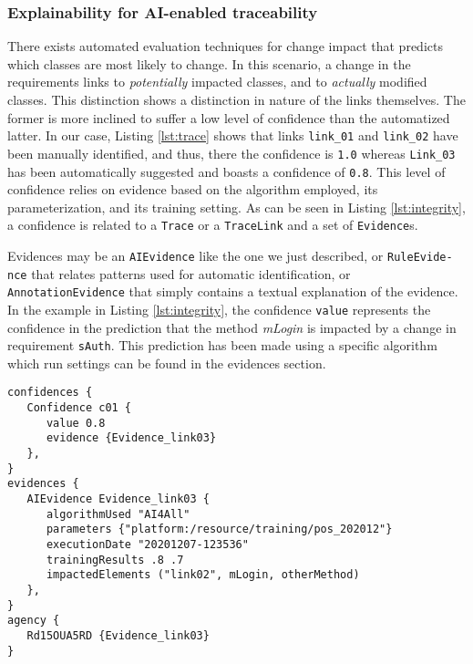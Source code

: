 \subsubsection{Explainability for AI-enabled traceability}
There exists automated evaluation techniques for change impact that predicts which classes are most likely to change. In this scenario, a change in the requirements links to \textit{potentially} impacted classes, and to \textit{actually} modified classes. This distinction shows a distinction in nature of the links themselves. The former is more inclined to suffer a low level of confidence than the automatized latter. In our case, Listing \ref{lst:trace} shows that links \texttt{link\_01} and \texttt{link\_02} have been manually identified, and thus, there the confidence is \texttt{1.0} whereas \texttt{Link\_03} has been automatically suggested and boasts a confidence of \texttt{0.8}.
This level of confidence relies on evidence based on the algorithm employed, its parameterization, and its training setting. As can be seen in Listing \ref{lst:integrity}, a confidence is related to a \texttt{Trace} or a \texttt{TraceLink} and a set of \texttt{Evidence}s. %

Evidences may be an \texttt{AIEvidence} like the one we just described, or \texttt{RuleEvide- nce} that relates patterns used for automatic identification, or \texttt{AnnotationEvidence} that simply contains a textual explanation of the evidence. 
In the example in Listing \ref{lst:integrity}, the confidence \texttt{value} represents the confidence in the prediction that the method \textit{mLogin} is impacted by a change in requirement \texttt{sAuth}. This prediction has been made using a specific algorithm which run settings can be found in the evidences section.

\begin{center}
\noindent\begin{minipage}[t]{.72\textwidth}
\begin{lstlisting}[caption={Confidence, evidence, and agency},frame=tlrb,label=lst:integrity]
confidences {
   Confidence c01 { 
      value 0.8
      evidence {Evidence_link03}
   },
}
evidences {
   AIEvidence Evidence_link03 {
      algorithmUsed "AI4All"
      parameters {"platform:/resource/training/pos_202012"}
      executionDate "20201207-123536"
      trainingResults .8 .7    
      impactedElements ("link02", mLogin, otherMethod) 
   },
}
agency {
   Rd15OUA5RD {Evidence_link03}
}
\end{lstlisting}
\end{minipage}
\end{center}
